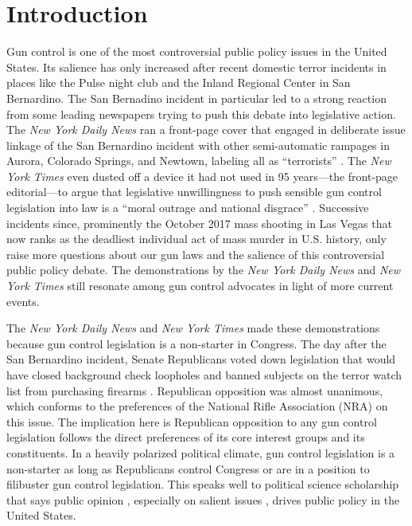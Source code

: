 \documentclass[11pt,]{article}
\begin{document}
\vskip 6.5pt


\noindent  \section{Introduction}\label{introduction}

Gun control is one of the most controversial public policy issues in the
United States. Its salience has only increased after recent domestic
terror incidents in places like the Pulse night club and the Inland
Regional Center in San Bernardino. The San Bernadino incident in
particular led to a strong reaction from some leading newspapers trying
to push this debate into legislative action. The \emph{New York Daily
News} ran a front-page cover that engaged in deliberate issue linkage of
the San Bernardino incident with other semi-automatic rampages in
Aurora, Colorado Springs, and Newtown, labeling all as ``terrorists''
\citep{nydn2015ht}. The \emph{New York Times} even dusted off a device
it had not used in 95 years---the front-page editorial---to argue that
legislative unwillingness to push sensible gun control legislation into
law is a ``moral outrage and national disgrace'' \citep{nyt2015egea}.
Successive incidents since, prominently the October 2017 mass shooting
in Las Vegas that now ranks as the deadliest individual act of mass
murder in U.S. history, only raise more questions about our gun laws and
the salience of this controversial public policy debate. The
demonstrations by the \emph{New York Daily News} and \emph{New York
Times} still resonate among gun control advocates in light of more
current events.

The \emph{New York Daily News} and \emph{New York Times} made these
demonstrations because gun control legislation is a non-starter in
Congress. The day after the San Bernardino incident, Senate Republicans
voted down legislation that would have closed background check loopholes
and banned subjects on the terror watch list from purchasing firearms
\citep{joseph2015srvd}. Republican opposition was almost unanimous,
which conforms to the preferences of the National Rifle Association
(NRA) on this issue. The implication here is Republican opposition to
any gun control legislation follows the direct preferences of its core
interest groups and its constituents. In a heavily polarized political
climate, gun control legislation is a non-starter as long as Republicans
control Congress or are in a position to filibuster gun control
legislation. This speaks well to political science scholarship that says
public opinion \citep[e.g.][]{pageshapiro1983epop}, especially on
salient issues \citep{burstein2003ipo}, drives public policy in the
United States.
\end{document}
